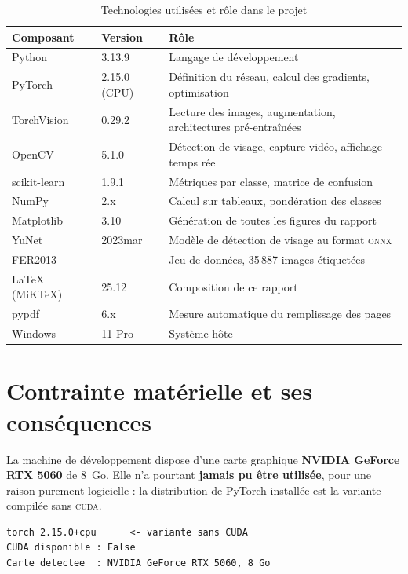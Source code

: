 \documentclass[a4paper,12pt]{report}
\begin{document}
\begin{table}[htbp]
\centering
\caption{Technologies utilisées et rôle dans le projet}
\label{tab:technos}
\begin{tabularx}{\textwidth}{|l|l|>{\raggedright\arraybackslash}X|}
\hline
\textbf{Composant} & \textbf{Version} & \textbf{Rôle} \\
\hline
Python & 3.13.9 & Langage de développement \\
PyTorch & 2.15.0 (CPU) & Définition du réseau, calcul des gradients, optimisation \\
TorchVision & 0.29.2 & Lecture des images, augmentation, architectures pré-entraînées \\
OpenCV & 5.1.0 & Détection de visage, capture vidéo, affichage temps réel \\
scikit-learn & 1.9.1 & Métriques par classe, matrice de confusion \\
NumPy & 2.x & Calcul sur tableaux, pondération des classes \\
Matplotlib & 3.10 & Génération de toutes les figures du rapport \\
\hline
YuNet & 2023mar & Modèle de détection de visage au format \textsc{onnx} \\
FER2013 & -- & Jeu de données, 35\,887 images étiquetées \\
\hline
\LaTeX{} (MiKTeX) & 25.12 & Composition de ce rapport \\
pypdf & 6.x & Mesure automatique du remplissage des pages \\
Windows & 11 Pro & Système hôte \\
\hline
\end{tabularx}
\end{table}

\section{Contrainte matérielle et ses conséquences}
\label{sec:materiel}

La machine de développement dispose d'une carte graphique \textbf{NVIDIA
GeForce RTX 5060} de 8~Go. Elle n'a pourtant \textbf{jamais pu être utilisée},
pour une raison purement logicielle : la distribution de PyTorch installée est
la variante compilée sans \textsc{cuda}.

\begin{lstlisting}[basicstyle=\ttfamily\small,frame=single,backgroundcolor=\color{black!3}]
torch 2.15.0+cpu      <- variante sans CUDA
CUDA disponible : False
Carte detectee  : NVIDIA GeForce RTX 5060, 8 Go
\end{lstlisting}
\end{document}
